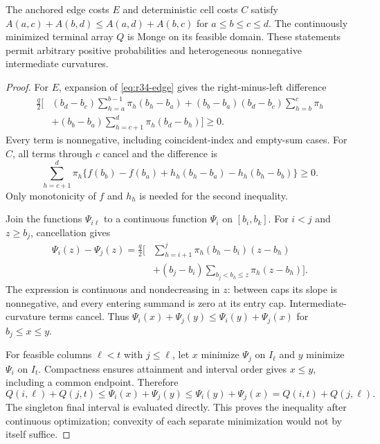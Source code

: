 \begin{lemma}\label{lem:r37-cost}
The anchored edge costs $E$ and deterministic cell costs $C$ satisfy $A(a,c)+A(b,d)\leq A(a,d)+A(b,c)$ for $a\leq b\leq c\leq d$. The continuously minimized terminal array $Q$ is Monge on its feasible domain. These statements permit arbitrary positive probabilities and heterogeneous nonnegative intermediate curvatures.
\end{lemma}
\begin{proof}
For $E$, expansion of \eqref{eq:r34-edge} gives the right-minus-left difference
\begin{align*}
 \frac q2\biggl[&(b_d-b_c)\sum_{h=a}^{b-1}\pi_h(b_h-b_a)
 +(b_b-b_a)(b_d-b_c)\sum_{h=b}^{c}\pi_h\\
 &+(b_b-b_a)\sum_{h=c+1}^{d}\pi_h(b_d-b_h)\biggr]\geq0.
\end{align*}
Every term is nonnegative, including coincident-index and empty-sum cases. For $C$, all terms through $c$ cancel and the difference is
\[
 \sum_{h=c+1}^{d}\pi_h\{f(b_b)-f(b_a)+h_h(b_h-b_a)-h_h(b_h-b_b)\}\geq0.
\]
Only monotonicity of $f$ and $h_h$ is needed for the second inequality.

Join the functions $\Psi_{i\ell}$ to a continuous function $\Psi_i$ on $[b_i,b_k]$. For $i<j$ and $z\geq b_j$, cancellation gives
\begin{align}
 \Psi_i(z)-\Psi_j(z)=\frac q2\biggl[&\sum_{h=i+1}^{j}\pi_h(b_h-b_i)(z-b_h)\nonumber\\
 &+(b_j-b_i)\sum_{b_j<b_h\leq z}\pi_h(z-b_h)\biggr].\label{eq:r37-crossing}
\end{align}
The expression is continuous and nondecreasing in $z$: between caps its slope is nonnegative, and every entering summand is zero at its entry cap. Intermediate-curvature terms cancel. Thus $\Psi_i(x)+\Psi_j(y)\leq\Psi_i(y)+\Psi_j(x)$ for $b_j\leq x\leq y$.

For feasible columns $\ell<t$ with $j\leq\ell$, let $x$ minimize $\Psi_j$ on $I_\ell$ and $y$ minimize $\Psi_i$ on $I_t$. Compactness ensures attainment and interval order gives $x\leq y$, including a common endpoint. Therefore
\[
 Q(i,\ell)+Q(j,t)\leq\Psi_i(x)+\Psi_j(y)
 \leq\Psi_i(y)+\Psi_j(x)=Q(i,t)+Q(j,\ell).
\]
The singleton final interval is evaluated directly. This proves the inequality after continuous optimization; convexity of each separate minimization would not by itself suffice.
\end{proof}

